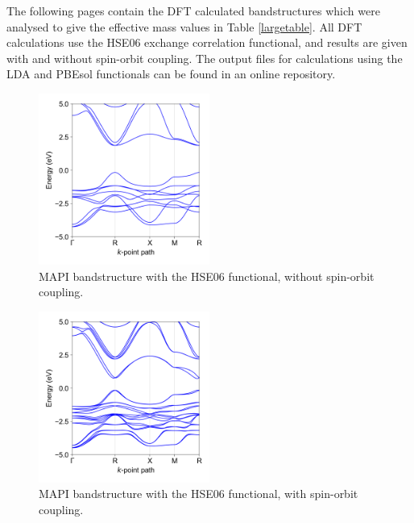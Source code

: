 The following pages contain the DFT calculated bandstructures which were analysed to give the effective mass values in Table \ref{largetable}. All DFT calculations use the HSE06 exchange correlation functional, and results  are given with and without spin-orbit coupling. The output files for calculations using the LDA and PBEsol functionals can be found in an online repository.\autocite{Whalley2018b}

\begin{figure}[htb] \centering
\includegraphics[width=0.5\textwidth]{./figures/ap2/MAPI_hybrid.png}
\caption[ bandstructure, HSE06, no-SoC]{MAPI bandstructure with the HSE06 functional, without spin-orbit coupling. }
\end{figure}

\begin{figure}[htb] \centering
\includegraphics[width=0.5\textwidth]{./figures/ap2/MAPI_hybrid_SoC.png}
\caption[ bandstructure, HSE06, SoC]{MAPI bandstructure with the HSE06 functional, with spin-orbit coupling. }
\end{figure}

\clearpage

